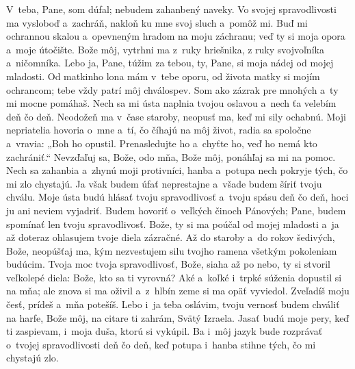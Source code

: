 V~teba, Pane, som dúfal;
nebudem zahanbený naveky.
Vo svojej spravodlivosti ma vysloboď a~zachráň,
\versseparator
nakloň ku mne svoj sluch a~pomôž mi.
\versseparator
Buď mi ochrannou skalou
a~opevneným hradom na moju záchranu;
\versseparator
veď ty si moja opora a~moje útočište.
\versseparator
Bože môj, vytrhni ma z~ruky hriešnika,
z ruky svojvoľníka a~ničomníka.
\versseparator
Lebo ja, Pane, túžim za tebou,
ty, Pane, si moja nádej od mojej mladosti.
\versseparator
Od matkinho lona mám v~tebe oporu,
od života matky si mojím ochrancom;
\versseparator
tebe vždy patrí môj chválospev.
Som ako zázrak pre mnohých
a~ty mi mocne pomáhaš.
\versseparator
Nech sa mi ústa naplnia tvojou oslavou
a~nech ťa velebím deň čo deň.
\versseparator
Neodožeň ma v~čase staroby,
neopusť ma, keď mi sily ochabnú.
\versseparator
Moji nepriatelia hovoria o~mne
a~tí, čo číhajú na môj život,
radia sa spoločne
\versseparator
a~vravia: „Boh ho opustil.
Prenasledujte ho a~chyťte ho,
veď ho nemá kto zachrániť.“
\versseparator
Nevzďaľuj sa, Bože, odo mňa,
Bože môj, ponáhľaj sa mi na pomoc.
\versseparator
Nech sa zahanbia a~zhynú moji protivníci,
hanba a~potupa nech pokryje tých, čo mi zlo chystajú.
\versseparator
Ja však budem úfať neprestajne
a~všade budem šíriť tvoju chválu.
\versseparator
Moje ústa budú hlásať tvoju spravodlivosť
a~tvoju spásu deň čo deň,
\versseparator
hoci ju ani neviem vyjadriť.
Budem hovoriť o~veľkých činoch Pánových;
Pane, budem spomínať len tvoju spravodlivosť.
\versseparator
Bože, ty si ma poúčal od mojej mladosti
a~ja až doteraz ohlasujem tvoje diela zázračné.
\versseparator
Až do staroby a~do rokov šedivých,
Bože, neopúšťaj ma,
\versseparator
kým nezvestujem silu tvojho ramena
všetkým pokoleniam budúcim.
\versseparator
Tvoja moc tvoja spravodlivosť, Bože,
siaha až po nebo, ty si stvoril veľkolepé diela:
Bože, kto sa ti vyrovná?
\versseparator
Aké a~koľké i~trpké súženia dopustil si na mňa;
ale znova si ma oživil
a~z~hlbín zeme si ma opäť vyviedol.
\versseparator
Zveľadíš moju česť,
prídeš a~mňa potešíš.
\versseparator
Lebo i~ja teba oslávim,
tvoju vernosť budem chváliť na harfe, Bože môj,
na citare ti zahrám, Svätý Izraela.
\versseparator
Jasať budú moje pery, keď ti zaspievam,
 i~moja duša, ktorú si vykúpil.
\versseparator
Ba i~môj jazyk bude rozprávať o~tvojej spravodlivosti deň čo deň,
keď potupa i~hanba stihne tých, čo mi chystajú zlo.